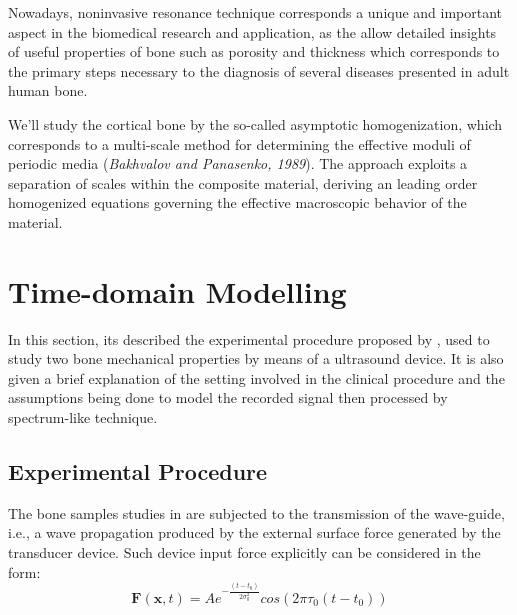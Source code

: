 Nowadays, noninvasive resonance technique corresponds a unique and important aspect in the biomedical research and application, as the allow detailed insights of useful properties of bone such as porosity and thickness which corresponds to the primary steps necessary to the diagnosis of several diseases presented in adult human bone.

We'll study the cortical bone by the so-called asymptotic homogenization, which corresponds to a multi-scale method for determining the effective moduli of periodic media (\textit{Bakhvalov and Panasenko, 1989}). The approach exploits a separation of scales within the composite material, deriving an leading order homogenized equations governing the effective macroscopic behavior of the material.\\


\section{Time-domain Modelling}
In this section, its described the experimental procedure proposed by \cite{Foiret2014}, \cite{Minonzio2018} used to study two bone mechanical properties by means of a ultrasound device. 
It is also given a brief explanation of the setting involved in the clinical procedure and the assumptions being done to model the recorded signal then processed by spectrum-like technique. 

\subsection{Experimental Procedure}
The bone samples studies in \cite{Foiret2014} \cite{Minonzio2018} are subjected to the transmission of the wave-guide, i.e., a wave propagation produced by the external surface force generated by the transducer device. 
Such device input force explicitly can be considered in the form:
\begin{equation*}
    \mathbf{F}(\mathbf{x},t) = A e^{-\frac{(t-t_0)}{2\sigma_0^2}} cos(2 \pi \tau_0 (t-t_0))
\end{equation*}

